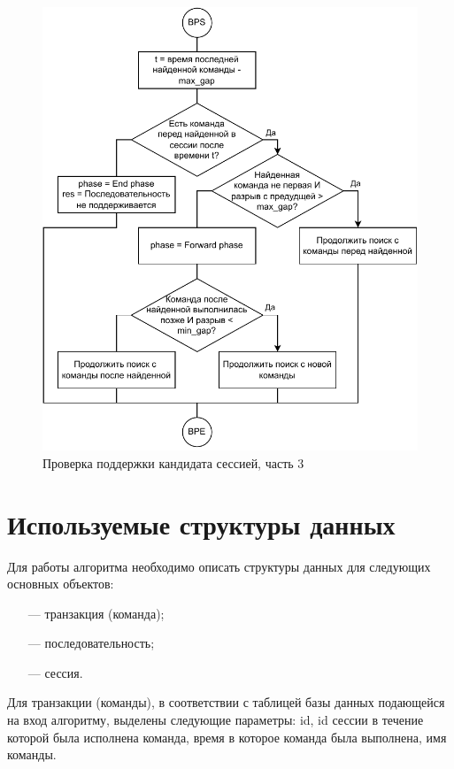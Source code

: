\newpage
\begin{figure}[h!]
	\centering
	\includegraphics[width=1\textwidth]{inc/img/backward_phase.drawio.pdf}
	\caption{Проверка поддержки кандидата сессией, часть 3}
	\label{backward_phase}
\end{figure}

\newpage
\section{Используемые структуры данных}
Для работы алгоритма необходимо описать структуры данных для следующих основных объектов:
\begin{enumerate}
	\item[---] транзакция (команда);
	\item[---] последовательность;
	\item[---] сессия.
\end{enumerate}

Для транзакции (команды), в соответствии с таблицей базы данных подающейся на вход алгоритму, выделены следующие параметры:
id, id сессии в течение которой была исполнена команда, время в которое команда была выполнена, имя команды.

